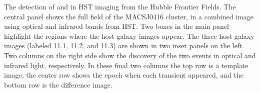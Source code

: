 \label{fig:SpockDetectionImages}
The detection of \spockone and \spocktwo in HST imaging from the Hubble Frontier Fields. The central panel shows the full field of the MACSJ0416 cluster, in a combined image using optical and infrared bands from HST.  Two boxes in the main panel highlight the regions where the \spock host galaxy images appear.  The three host galaxy images (labeled 11.1, 11.2, and 11.3) are shown in two inset panels on the left.  Two columns on the right side show the discovery of the two events in optical and infrared light, respectively.  In these final two columns the top row is a template image, the center row shows the epoch when each transient appeared, and the bottom row is the difference image.
